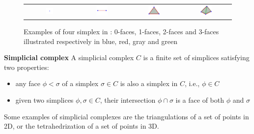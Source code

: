 \begin{figure}[t]
\centering
\begin{tabular}{cccc}
\includegraphics[width=0.15\textwidth]{./img/simplex01}&
\includegraphics[width=0.25\textwidth]{./img/simplex02}&
\includegraphics[width=0.25\textwidth]{./img/simplex03}&
\includegraphics[width=0.25\textwidth]{./img/simplex04}
\end{tabular}
\caption{Examples of four simplex in \Rthree: 0-faces, 1-faces, 2-faces and 3-faces illustrated respectively in blue, red, gray and green}
\label{fig:simplices}
\end{figure}


\begin{mydef}
\textbf{Simplicial complex}
A simplicial complex $C$ is a finite set of simplices satisfying two properties:
\begin{itemize}
  \item any face $\phi < \sigma$ of a simplex $\sigma \in C$ is also a simplex in $C$, i.e., $\phi \in C$
  \item given two simplices $\phi, \sigma \in C$, their intersection $\phi \cap \sigma$ is a face of both $\phi$ and $\sigma$
\end{itemize}
\end{mydef}
Some examples of simplicial complexes are the triangulations of a set of points in 2D, or the tetrahedrization of a set of points in 3D.

